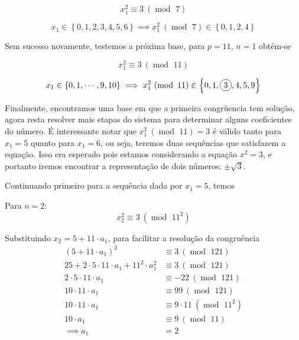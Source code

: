 \documentclass{report}
\newcommand*\circled[1]{\tikz[baseline=(char.base)]{
            \node[shape=circle,draw,inner sep=2pt] (char) {#1};}}
\DeclareMathOperator{\modulo}{mod \ }
\theoremstyle{definition}
\begin{document}
\begin{equation*}
    x_1^2 \equiv 3 \ (\modulo 7)
\end{equation*}

\begin{equation*}
    x_1 \in \left\lbrace 0,1,2,3,4,5,6 \right\rbrace \implies x_1^2 \ (\modulo 7) \in \left\lbrace 0,1,2,4 \right\rbrace
\end{equation*}

Sem sucesso novamente, testemos a próxima base, para $p=11$, $n=1$ obtém-se

\begin{equation*}
    x_1^2 \equiv 3 \ (\modulo 11)
\end{equation*}

\begin{equation*}
    x_1 \in \left\lbrace 0,1,\cdots,9,10 \right\rbrace \implies x_1^2 \ (\modulo 11) \in \left\lbrace 0,1,\circled{3},4,5,9 \right\rbrace
\end{equation*}

Finalmente, encontramos uma base em que a primeira congrûencia tem solução, agora resta resolver mais etapas do sistema para determinar alguns coeficientes do número. É interessante notar que $x_1^2 \ (\modulo 11) = 3$ é válido tanto para $x_1 = 5$ quanto para $x_1 = 6$, ou seja, teremos duas sequências que satisfazem a equação. Isso era esperado pois estamos considerando a equação $x^2 = 3$, e portanto iremos encontrar a representação de dois números: $\pm \sqrt{3}$.

Continuando primeiro para a sequência dada por $x_1 = 5$, temos

\bigskip
        
Para $n = 2$:
\begin{equation*}
    x_2^2 \equiv 3 \ (\modulo 11^2)
\end{equation*}

Substituindo $x_2 = 5 + 11 \cdot a_1$, para facilitar a resolução da congruência
\begin{align*}
    (5 + 11 \cdot a_1)^2 &\equiv 3 \ (\modulo 121) \\
    25 + 2 \cdot 5 \cdot 11 \cdot a_1 + 11^2 \cdot a_1^2 &\equiv 3 \ (\modulo 121) \\
    2 \cdot 5 \cdot 11 \cdot a_1 &\equiv -22 \ (\modulo 121) \\
    10 \cdot 11 \cdot a_1 &\equiv 99 \ (\modulo 121) \\
    10 \cdot 11 \cdot a_1 &\equiv 9 \cdot 11 \ (\modulo 11^2) \\
    10 \cdot a_1 &\equiv 9 \ (\modulo 11) \\
    \implies a_1 &= 2
\end{align*}
\end{document}

